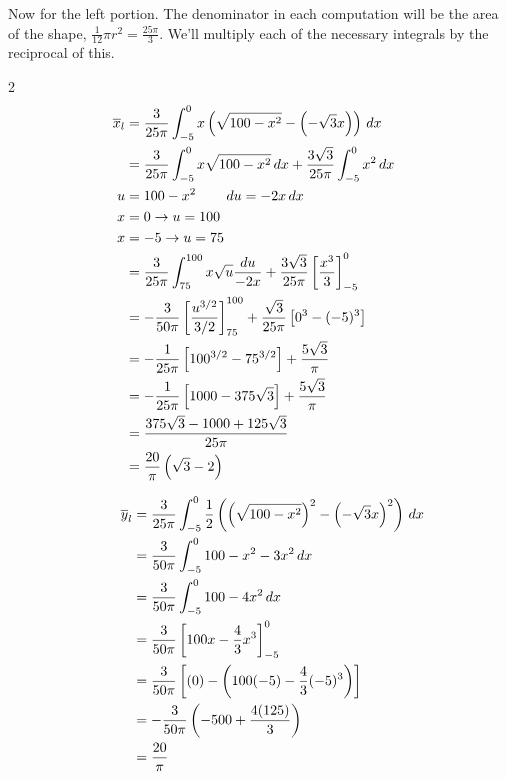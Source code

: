 \documentclass[12pt]{amsart}
\begin{document}
Now for the left portion. The denominator in each computation will be the area of the shape, $\frac{1}{12}\pi r^2 = \frac{25\pi}{3}$.  We'll multiply each of the necessary integrals by the reciprocal of this.
\begin{multicols}{2}
\hspace{-.25in}\begin{align*}
\overline{x}_l & = \frac{3}{25\pi}\int_{-5}^0 x\left(\sqrt{100 - x^2} - \left(-\sqrt{3}x\right)\right)\,dx \hspace{.25in}\\
& = \frac{3}{25\pi}\int_{-5}^0x\sqrt{100-x^2}\,dx + \frac{3\sqrt{3}}{25\pi}\int_{-5}^0 x^2\,dx\\
u & = 100 - x^2 \hspace{.3in} du = -2x\,dx\\
x & = 0 \rightarrow u = 100\\
x & = -5 \rightarrow u = 75\\
& = \frac{3}{25\pi}\int_{75}^{100} x\sqrt{u}\frac{du}{-2x} + \frac{3\sqrt{3}}{25\pi}\left[\frac{x^3}{3}\right]_{-5}^0\\
& = -\frac{3}{50\pi}\left[\frac{u^{3/2}}{3/2}\right]_{75}^{100} + \frac{\sqrt{3}}{25\pi}\left[0^3 - (-5)^3\right]\\
& = -\frac{1}{25\pi}\left[100^{3/2} - 75^{3/2}\right] + \frac{5\sqrt{3}}{\pi}\\
& = -\frac{1}{25\pi}\left[1000 - 375\sqrt{3}\right] + \frac{5\sqrt{3}}{\pi}\\
& = \frac{375\sqrt{3} - 1000 + 125\sqrt{3}}{25\pi}\\
& = \frac{20}{\pi}\left(\sqrt{3} - 2\right)
\end{align*}

\columnbreak

\begin{align*}
\hspace{.25in}\overline{y}_l& = \frac{3}{25\pi}\int_{-5}^0 \frac{1}{2}\left(\left(\sqrt{100 - x^2}\right)^2 - \left(-\sqrt{3}x\right)^2\right)\,dx\\
& = \frac{3}{50\pi}\int_{-5}^0 100 - x^2 - 3x^2\,dx\\
& = \frac{3}{50\pi}\int_{-5}^0 100 - 4x^2\,dx\\
& = \frac{3}{50\pi}\left[100x - \frac{4}{3}x^3\right]_{-5}^0\\
& = \frac{3}{50\pi}\left[(0) - \left(100(-5) - \frac{4}{3}(-5)^3\right)\right]\\
& = -\frac{3}{50\pi}\left(-500 + \frac{4(125)}{3}\right)\\
& = \frac{20}{\pi}
\end{align*}

\end{multicols}
\end{document}
